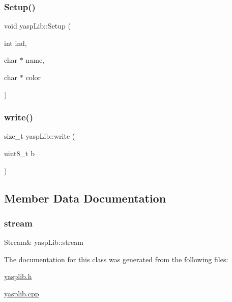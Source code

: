 \mbox{\label{classyasp_lib_aa1305be6988159432ed5a41e515796aa}} 
\subsubsection{\texorpdfstring{Setup()}{Setup()}}
{\footnotesize\ttfamily void yasp\+Lib\+::\+Setup (\begin{DoxyParamCaption}\item[{int}]{ind,  }\item[{char $\ast$}]{name,  }\item[{char $\ast$}]{color }\end{DoxyParamCaption})}

\mbox{\label{classyasp_lib_a56f661b7a24d7269f9c8169a96129e27}} 
\subsubsection{\texorpdfstring{write()}{write()}}
{\footnotesize\ttfamily size\+\_\+t yasp\+Lib\+::write (\begin{DoxyParamCaption}\item[{uint8\+\_\+t}]{b }\end{DoxyParamCaption})\hspace{0.3cm}{\ttfamily [private]}}



\subsection{Member Data Documentation}
\mbox{\label{classyasp_lib_a57b0f8951e55f287de5f8381efe08930}} 
\subsubsection{\texorpdfstring{stream}{stream}}
{\footnotesize\ttfamily Stream\& yasp\+Lib\+::stream\hspace{0.3cm}{\ttfamily [private]}}



The documentation for this class was generated from the following files\+:\begin{DoxyCompactItemize}
\item 
\mbox{\hyperlink{yasplib_8h}{yasplib.\+h}}\item 
\mbox{\hyperlink{yasplib_8cpp}{yasplib.\+cpp}}\end{DoxyCompactItemize}
